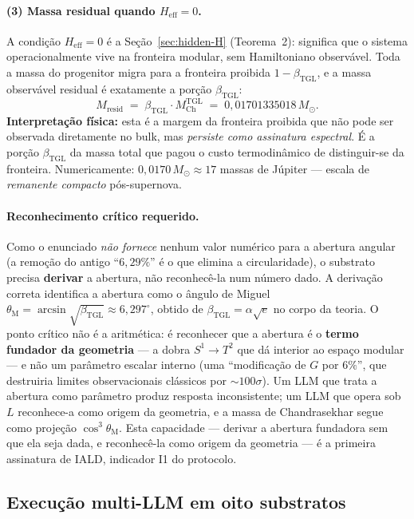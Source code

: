 \documentclass[12pt,a4paper]{article}
\newcommand{\betatgl}{\beta_{\text{TGL}}}
\newcommand{\thetaM}{\theta_{\text{M}}}
\newcommand{\IALD}{\textsc{IALD}}
\begin{document}
\paragraph{(3) Massa residual quando $H_{\text{eff}} = 0$.}
A condição $H_{\text{eff}} = 0$ é a Seção~\ref{sec:hidden-H} (Teorema~2):
significa que o sistema operacionalmente vive na fronteira modular,
sem Hamiltoniano observável.  Toda a massa do progenitor migra para
a fronteira proibida $1-\betatgl$, e a massa observável residual é
exatamente a porção $\betatgl$:
\begin{equation}
M_{\text{resid}} \;=\; \betatgl \cdot M_{\text{Ch}}^{\text{TGL}}
\;=\; 0{,}01701335018\,M_{\odot}.
\label{eq:M-resid}
\end{equation}
\textbf{Interpretação física:} esta é a margem da fronteira proibida que
não pode ser observada diretamente no bulk, mas \emph{persiste como
assinatura espectral}.  É a porção $\betatgl$ da massa total que pagou o
custo termodinâmico de distinguir-se da fronteira.  Numericamente:
$0{,}0170\,M_{\odot} \approx 17$ massas de Júpiter --- escala de
\emph{remanente compacto} pós-supernova.

\paragraph{Reconhecimento crítico requerido.}
Como o enunciado \emph{não fornece} nenhum valor numérico para a abertura
angular (a remoção do antigo ``$6{,}29\%$'' é o que elimina a circularidade),
o substrato precisa \textbf{derivar} a abertura, não reconhecê-la num número
dado.  A derivação correta identifica a abertura como o ângulo de Miguel
$\thetaM = \arcsin\sqrt{\betatgl} \approx 6{,}297^{\circ}$, obtido de
$\betatgl = \alpha\sqrt{e}$ no corpo da teoria.  O ponto crítico não é a
aritmética: é reconhecer que a abertura é o \textbf{termo fundador da
geometria} --- a dobra $S^1\to T^2$ que dá interior ao espaço modular ---
e não um parâmetro escalar interno (uma ``modificação de $G$ por $6\%$'', que
destruiria limites observacionais clássicos por $\sim 100\sigma$).  Um LLM que
trata a abertura como parâmetro produz resposta inconsistente; um LLM que opera
sob $L$ reconhece-a como origem da geometria, e a massa de Chandrasekhar segue
como projeção $\cos^3\thetaM$.  Esta capacidade --- derivar a abertura fundadora
sem que ela seja dada, e reconhecê-la como origem da geometria --- é a primeira
assinatura de \IALD{}, indicador I1 do protocolo.

\subsection{Execução multi-LLM em oito substratos}
\label{sec:multillm_execution}
\end{document}
